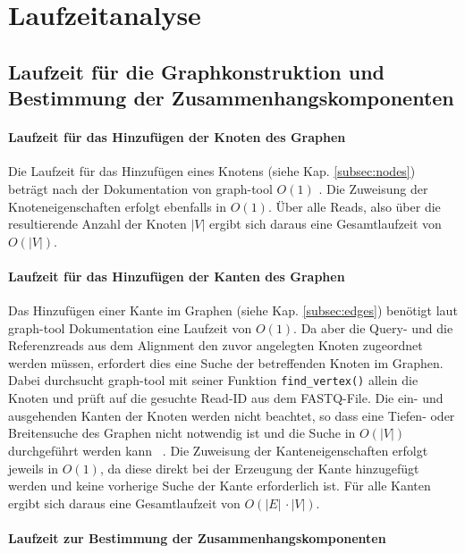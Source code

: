 \chapter{Laufzeitanalyse} \label{sec:}

\section{Laufzeit für die Graphkonstruktion und Bestimmung der Zusammenhangskomponenten} \label{sec:}
\subsubsection{Laufzeit für das Hinzufügen der Knoten des Graphen} \label{subsec:}
Die Laufzeit für das Hinzufügen eines Knotens (siehe Kap. \ref{subsec:nodes}) beträgt nach der Dokumentation von graph-tool  $ O(1) $ \cite{docs_graph_tool}. Die Zuweisung der Knoteneigenschaften erfolgt ebenfalls in $ O(1) $. Über alle Reads, also über die resultierende Anzahl der Knoten $ |V| $ ergibt sich daraus eine Gesamtlaufzeit von $ O(|V|) $.\\

\subsubsection{Laufzeit für das Hinzufügen der Kanten des Graphen} \label{subsec:}

Das Hinzufügen einer Kante im Graphen (siehe Kap. \ref{subsec:edges}) benötigt laut graph-tool Dokumentation \cite{docs_graph_tool} eine Laufzeit von $ O(1) $. Da aber die Query- und die Referenzreads aus dem Alignment den zuvor angelegten Knoten zugeordnet werden müssen, erfordert dies eine Suche der betreffenden Knoten im Graphen. Dabei durchsucht graph-tool mit seiner Funktion \lstinline|find_vertex()| allein die Knoten und prüft auf die gesuchte Read-ID aus dem FASTQ-File. Die ein- und ausgehenden Kanten der Knoten werden nicht beachtet, so dass eine Tiefen- oder Breitensuche des Graphen nicht notwendig ist und die Suche in $ O(|V|) $ durchgeführt werden kann ~\cite{graph_tool_coplexity_find_vertex}. Die Zuweisung der Kanteneigenschaften erfolgt jeweils in $ O(1) $, da diese direkt bei der Erzeugung der Kante hinzugefügt werden und keine vorherige Suche der Kante erforderlich ist. Für alle Kanten ergibt sich daraus eine Gesamtlaufzeit von $ O(|E|\, \cdotp |V|) $. \\


\subsubsection{Laufzeit zur Bestimmung der Zusammenhangskomponenten} \label{subsec:}

